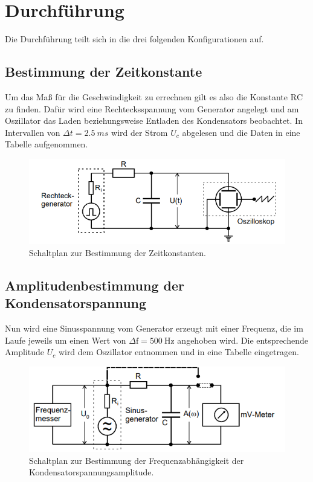 \section{Durchführung}
Die Durchführung teilt sich in die  drei folgenden Konfigurationen auf.
\subsection{Bestimmung der Zeitkonstante}
Um das Maß für die Geschwindigkeit zu errechnen gilt es also die Konstante $\text{RC}$ zu finden.
Dafür wird eine Rechtecksspannung vom Generator angelegt und am Oszillator das Laden beziehungsweise Entladen des
Kondensators beobachtet. In Intervallen von $\Delta t = \SI{2.5}{ms}$ wird der Strom $U_c$ abgelesen und die
Daten in eine Tabelle aufgenommen. 
\begin{figure}
    \centering
    \includegraphics[width=\textwidth]{bilder/RC.png}
    \caption{Schaltplan zur Bestimmung der Zeitkonstanten.\cite{skript}}
    \label{fig:RC}
\end{figure}

\subsection{Amplitudenbestimmung der Kondensatorspannung}
\label{sectionref}
Nun wird eine Sinusspannung vom Generator erzeugt mit einer Frequenz, die im Laufe jeweils um einen Wert
von $\Delta \text{f}= \SI{500}{\hertz}$ angehoben wird. Die entsprechende Amplitude $U_c$ wird 
dem Oszillator entnommen und in eine Tabelle eingetragen.
 \begin{figure}
    \centering
    \includegraphics[width=\textwidth]{bilder/amplitude.png}
    \caption{Schaltplan zur Bestimmung der Frequenzabhängigkeit der Kondensatorspannungsamplitude.\cite{skript}}
    \label{fig:amp}
\end{figure}


